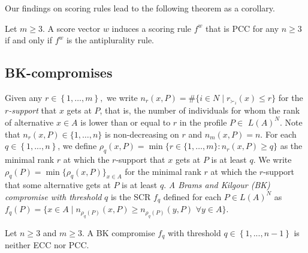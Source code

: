 \documentclass[version=3.21, pagesize, twoside=off, bibliography=totoc, DIV=calc, fontsize=12pt, a4paper]{scrartcl}
\begin{document}
Our findings on scoring rules lead to the following theorem as a corollary.

\begin{theorem}
Let $m\geq 3.$ A score vector $w$ induces a scoring rule $f^w$ that is
PCC for any $n\geq 3$ if and only if $f^w$ is the antiplurality rule.
\end{theorem}

\subsection{BK-compromises}
\label{sec:BKn3}
Given any $r\in \left\{ 1,\ldots ,m\right\} ,$ we write $n_{r}(x,P)=\#\{i\in
N\mid r_{\succ _{i}}(x)\leq r\}$ for the \emph{$r$-support} that $x$ gets at $P$, that is, the number of individuals for whom the rank of alternative $x\in A$ is lower than or equal to $r$ in the profile $P\in $ $L(A)^{N}$.
Note that $n_{r}(x,P)\in \{1,\ldots ,n\}$ is non-decreasing on $r$ and $%
n_{m}(x,P)=n.$ For each $q\in \left\{ 1,...,n\right\} $, we define $\rho
_{q}(x,P)=\min \{r\in \{1,\ldots ,m\}:n_{r}(x,P)\geq q\}$ as the minimal
rank $r$ at which the $r$-support that $x$ gets at $P$ is at least $q$. We
write $\rho _{q}(P)=\min \{\rho _{q}(x,P)\}_{x\in A}$ for the minimal rank $%
r $ at which the $r$-support that some alternative gets at $P$ is at least $q
$. \textit{A Brams and Kilgour (BK) compromise with threshold }$q$ is the
SCR $f_{q}$ defined for each $P\in L(A)^{N}$ as $f_{q}(P)=\{x\in A\mid
n_{\rho _{q}(P)}(x,P)\geq n_{\rho _{q}(P)}(y,P)$ $\forall y\in A\}.$

\begin{theorem}
	\label{th:BKthreshold}
Let $n\geq 3$ and $m\geq 3.$ A BK compromise $f_{q}$ with threshold $q\in
\left\{ 1,...,n-1\right\} $ is neither ECC nor PCC.
\end{theorem}
\end{document}
